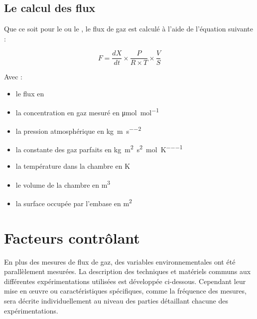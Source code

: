 \subsection{Le calcul des flux}

Que ce soit pour le \coo ou le \chh, le flux de gaz est calculé à l'aide de l'équation suivante : 

\begin{equation}
F = \frac{dX}{dt} \times \frac{P}{R \times T} \times \frac{V}{S}
\end{equation}

Avec : 
\begin{itemize}
\item[F :] le flux en \si{\uml}
\item[X :] la concentration en gaz mesuré en \si{\micro\mole\per\mole}
\item[P :] la pression atmosphérique en \si{\kilo\gram\per\metre\per\square\second}
\item[R :] la constante des gaz parfaits en \si{\kilo\gram\square\metre\per\square\second\per\mole\per\kelvin}
\item[T :] la température dans la chambre en \si{\kelvin}
\item[V :] le volume de la chambre en \si{\cubic\metre}
\item[S :] la surface occupée par l'embase en \si{\square\metre}
\end{itemize}

%
%


\section{Facteurs contrôlant}
En plus des mesures de flux de gaz, des variables environnementales ont été parallèlement mesurées.
La description des techniques et matériels communs aux différentes expérimentations utilisées est développée ci-dessous.
Cependant leur mise en œuvre ou caractéristiques spécifiques, comme la fréquence des mesures, sera décrite individuellement au niveau des parties détaillant chacune des expérimentations.


